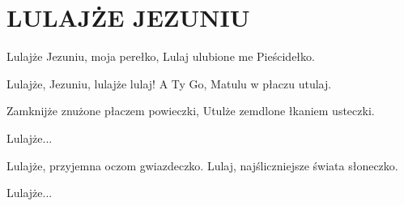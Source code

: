 \documentclass[../../../songbook.tex]{subfiles}
\begin{document}
\TabPositions{8cm} %
\section*{LULAJŻE JEZUNIU}
{}
\vspace{0.5cm}
Lulajże Jezuniu, moja perełko, 	   \newline
Lulaj ulubione me Pieścidełko.  	   \newline

\-\hspace{1cm} Lulajże, Jezuniu, lulajże lulaj! 	  \newline
\-\hspace{1cm} A Ty Go, Matulu w płaczu utulaj.   \newline

Zamknijże znużone płaczem powieczki, 	 \newline
Utulże zemdlone łkaniem usteczki.  	 \newline	 

\-\hspace{1cm} Lulajże...   \newline

Lulajże, przyjemna oczom gwiazdeczko.  \newline 	
Lulaj, najśliczniejsze świata słoneczko.   \newline	

\-\hspace{1cm} Lulajże...  \newline
\end{document}
